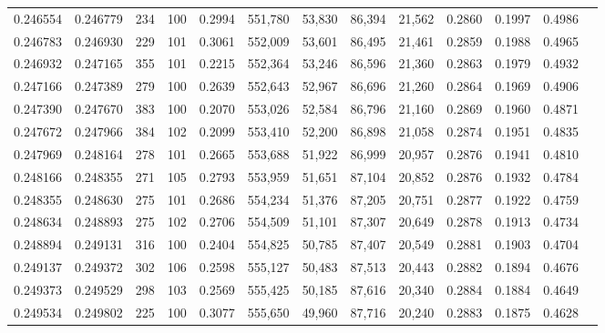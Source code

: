 \begin{tabular}{rrrrrrrrrrrrr}
0.246554 & 0.246779 &   234 & 100 &                                     0.2994 & 551,780 &  53,830 &  86,394 &  21,562 & 0.2860 & 0.1997 & 0.4986 \\
0.246783 & 0.246930 &   229 & 101 &                                     0.3061 & 552,009 &  53,601 &  86,495 &  21,461 & 0.2859 & 0.1988 & 0.4965 \\
0.246932 & 0.247165 &   355 & 101 &                                     0.2215 & 552,364 &  53,246 &  86,596 &  21,360 & 0.2863 & 0.1979 & 0.4932 \\
0.247166 & 0.247389 &   279 & 100 &                                     0.2639 & 552,643 &  52,967 &  86,696 &  21,260 & 0.2864 & 0.1969 & 0.4906 \\
0.247390 & 0.247670 &   383 & 100 &                                     0.2070 & 553,026 &  52,584 &  86,796 &  21,160 & 0.2869 & 0.1960 & 0.4871 \\
0.247672 & 0.247966 &   384 & 102 &                                     0.2099 & 553,410 &  52,200 &  86,898 &  21,058 & 0.2874 & 0.1951 & 0.4835 \\
0.247969 & 0.248164 &   278 & 101 &                                     0.2665 & 553,688 &  51,922 &  86,999 &  20,957 & 0.2876 & 0.1941 & 0.4810 \\
0.248166 & 0.248355 &   271 & 105 &                                     0.2793 & 553,959 &  51,651 &  87,104 &  20,852 & 0.2876 & 0.1932 & 0.4784 \\
0.248355 & 0.248630 &   275 & 101 &                                     0.2686 & 554,234 &  51,376 &  87,205 &  20,751 & 0.2877 & 0.1922 & 0.4759 \\
0.248634 & 0.248893 &   275 & 102 &                                     0.2706 & 554,509 &  51,101 &  87,307 &  20,649 & 0.2878 & 0.1913 & 0.4734 \\
0.248894 & 0.249131 &   316 & 100 &                                     0.2404 & 554,825 &  50,785 &  87,407 &  20,549 & 0.2881 & 0.1903 & 0.4704 \\
0.249137 & 0.249372 &   302 & 106 &                                     0.2598 & 555,127 &  50,483 &  87,513 &  20,443 & 0.2882 & 0.1894 & 0.4676 \\
0.249373 & 0.249529 &   298 & 103 &                                     0.2569 & 555,425 &  50,185 &  87,616 &  20,340 & 0.2884 & 0.1884 & 0.4649 \\
0.249534 & 0.249802 &   225 & 100 &                                     0.3077 & 555,650 &  49,960 &  87,716 &  20,240 & 0.2883 & 0.1875 & 0.4628 \\

\end{tabular}

